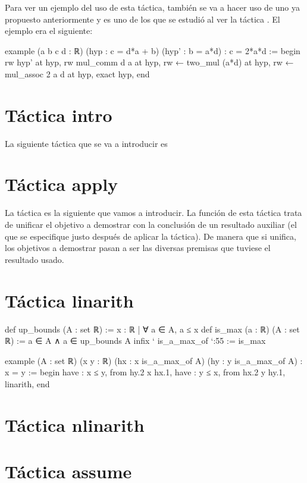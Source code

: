 Para ver un ejemplo del uso de esta táctica, también se va a hacer uso de uno
ya propuesto anteriormente y es uno de los que se estudió al ver la táctica
. El ejemplo era el siguiente:

\begin{leancode}
example (a b c d : ℝ) (hyp : c = d*a + b) (hyp' : b = a*d) : c = 2*a*d :=
begin
  rw hyp' at hyp,
  rw mul_comm d a at hyp,
  rw ← two_mul (a*d) at hyp,
  rw ← mul_assoc 2 a d at hyp,
  exact hyp,
end
\end{leancode}


\section{Táctica intro}
La siguiente táctica que se va a introducir es 

\section{Táctica apply}
La táctica  es la siguiente que vamos a introducir. La
función de esta táctica trata de unificar el objetivo a demostrar con la
conclusión de un resultado auxiliar (el que se especifique justo después de
aplicar la táctica). De manera que si unifica, los objetivos a demostrar pasan
a ser las diversas premisas que tuviese el resultado usado.

\section{Táctica linarith}

\begin{leancode}
def up_bounds (A : set ℝ) := { x : ℝ | ∀ a ∈ A, a ≤ x}
def is_max (a : ℝ) (A : set ℝ) := a ∈ A ∧ a ∈ up_bounds A
infix ` is_a_max_of `:55 := is_max

example (A : set ℝ) (x y : ℝ) (hx : x is_a_max_of A) (hy : y is_a_max_of A) :
x = y :=
begin
  have : x ≤ y, from hy.2 x hx.1,
  have : y ≤ x, from hx.2 y hy.1,
  linarith,
end
\end{leancode}

\section{Táctica nlinarith}

\section{Táctica assume}

